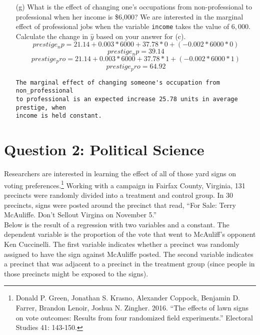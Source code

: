 \documentclass[12pt,letterpaper]{article}
\begin{document}
\begin{enumerate}
	\item [(g)]
	What is the effect of changing one's occupations from non-professional to professional when her income is \$6,000? We are interested in the marginal effect of professional jobs when the variable \texttt{income} takes the value of $6,000$. Calculate the change in $\hat{y}$ based on your answer for (c).
\begin{equation}
	prestige_np = 21.14 + 0.003*6000 +37.78*0 + (-0.002*6000*0)
\end{equation}
\begin{equation}
	prestige_np= 39.14
\end{equation}
\begin{equation}
  prestige_pro = 21.14 + 0.003*6000 + 37.78*1 + (-0.002*6000*1)
\end{equation}
\begin{equation}
prestige_pro = 64.92
\end{equation}
\begin{verbatim}
The marginal effect of changing someone's occupation from non_professional 
to professional is an expected increase 25.78 units in average prestige, when
income is held constant.
\end{verbatim}

	
\end{enumerate}

\newpage

\section*{Question 2: Political Science}
\vspace{.25cm}
\noindent 	Researchers are interested in learning the effect of all of those yard signs on voting preferences.\footnote{Donald P. Green, Jonathan	S. Krasno, Alexander Coppock, Benjamin D. Farrer,	Brandon Lenoir, Joshua N. Zingher. 2016. ``The effects of lawn signs on vote outcomes: Results from four randomized field experiments.'' Electoral Studies 41: 143-150. } Working with a campaign in Fairfax County, Virginia, 131 precincts were randomly divided into a treatment and control group. In 30 precincts, signs were posted around the precinct that read, ``For Sale: Terry McAuliffe. Don't Sellout Virgina on November 5.'' \\

Below is the result of a regression with two variables and a constant.  The dependent variable is the proportion of the vote that went to McAuliff's opponent Ken Cuccinelli. The first variable indicates whether a precinct was randomly assigned to have the sign against McAuliffe posted. The second variable indicates
a precinct that was adjacent to a precinct in the treatment group (since people in those precincts might be exposed to the signs).  \\
\end{document}
